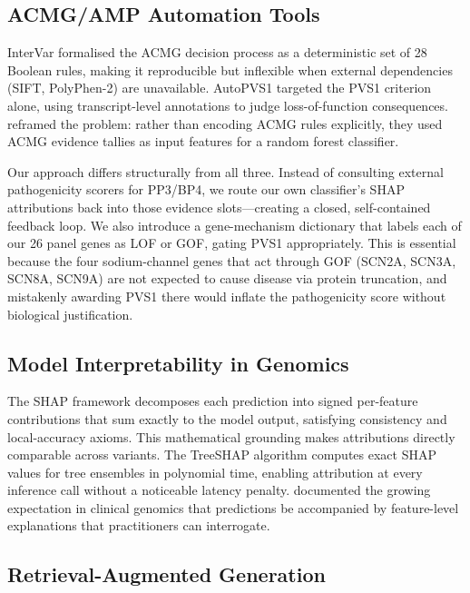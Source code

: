 \documentclass[12pt,a4paper]{article}
\begin{document}
\subsection{ACMG/AMP Automation Tools}

InterVar \citep{intervar2017} formalised the ACMG decision process
as a deterministic set of 28 Boolean rules, making it reproducible
but inflexible when external dependencies (SIFT, PolyPhen-2) are
unavailable. AutoPVS1 \citep{autopvs1_2020} targeted the PVS1
criterion alone, using transcript-level annotations to judge
loss-of-function consequences. \citet{nicora2022} reframed the
problem: rather than encoding ACMG rules explicitly, they used ACMG
evidence tallies as input features for a random forest classifier.

Our approach differs structurally from all three. Instead of
consulting external pathogenicity scorers for PP3/BP4, we route
our own classifier's SHAP attributions back into those evidence
slots---creating a closed, self-contained feedback loop. We also
introduce a gene-mechanism dictionary that labels each of our 26
panel genes as LOF or GOF, gating PVS1 appropriately. This is
essential because the four sodium-channel genes that act through
GOF (SCN2A, SCN3A, SCN8A, SCN9A) are not expected to cause disease
via protein truncation, and mistakenly awarding PVS1 there would
inflate the pathogenicity score without biological justification.

\subsection{Model Interpretability in Genomics}

The SHAP framework \citep{lundberg2017shap} decomposes each
prediction into signed per-feature contributions that sum exactly
to the model output, satisfying consistency and local-accuracy
axioms. This mathematical grounding makes attributions directly
comparable across variants. The TreeSHAP algorithm
\citep{lundberg2020trees} computes exact SHAP values for tree
ensembles in polynomial time, enabling attribution at every
inference call without a noticeable latency penalty.
\citet{watson2022} documented the growing expectation in clinical
genomics that predictions be accompanied by feature-level
explanations that practitioners can interrogate.

\subsection{Retrieval-Augmented Generation}
\end{document}

